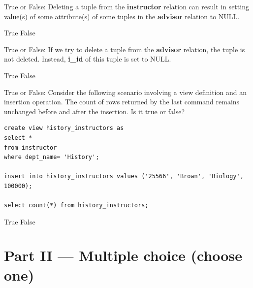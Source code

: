 \documentclass[12pt, addpoints, answers]{exam}
\begin{document}
\begin{questions}
\begin{minipage}{\linewidth}
\question[2]
True or False: Deleting a tuple from the \textbf{instructor} relation can result in setting value(s) of some attribute(s) 
of some tuples in the \textbf{advisor} relation to NULL.\par\vspace{0.5em}
\begin{checkboxes}
    \CorrectChoice True
    \choice False
\end{checkboxes}
\end{minipage}\vspace{1em}

\begin{minipage}{\linewidth}
\question[2]
True or False: If we try to delete a tuple from the \textbf{advisor} relation, the tuple is not deleted. 
Instead, \textbf{i\_id} of this tuple is set to NULL.\par\vspace{0.5em}
\begin{checkboxes}
    \choice True
    \CorrectChoice False
\end{checkboxes}
\end{minipage}\vspace{1em}

\begin{minipage}{\linewidth}
\question[3]
True or False: Consider the following scenario involving a view definition and an insertion operation. 
The count of rows returned by the last command remains unchanged before and after the insertion. Is it true or false?\par\vspace{0.5em}
\begin{verbatim}
create view history_instructors as
select * 
from instructor
where dept_name= 'History';

insert into history_instructors values ('25566', 'Brown', 'Biology', 100000);

select count(*) from history_instructors;
\end{verbatim}
\begin{checkboxes}
    \CorrectChoice True
    \choice False
\end{checkboxes}
\end{minipage}\vspace{1em}


\section*{Part II — Multiple choice (choose one)}


\end{questions}
\end{document}
